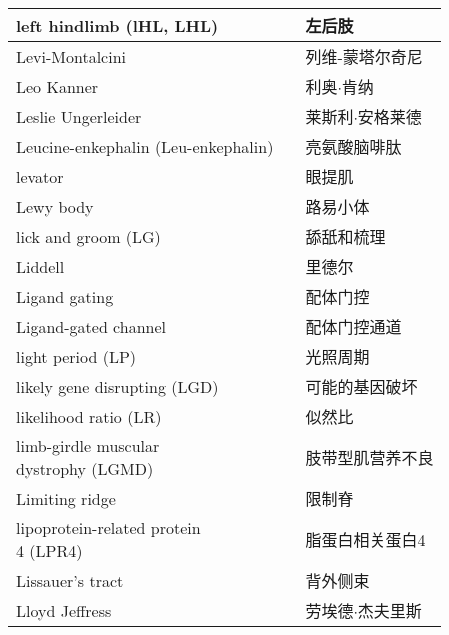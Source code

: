 \begin{longtable}{lll}
	\midrule
	left hindlimb (lHL, LHL)   && 左后肢  \\
	
	\midrule
	Levi-Montalcini   && 列维-蒙塔尔奇尼  \\
	
	\midrule
	Leo Kanner   && 利奥$\cdot$肯纳  \\
	
	\midrule
	Leslie Ungerleider   && 莱斯利$\cdot$安格莱德  \\
	
	\midrule
	Leucine-enkephalin (Leu-enkephalin)   && 亮氨酸脑啡肽  \\
	
	\midrule
	levator   && 眼提肌  \\
	
	\midrule
	Lewy body   && 路易小体  \\
	
	\midrule
	lick and groom (LG)  && 舔舐和梳理  \\
	
	\midrule
	Liddell  && 里德尔  \\
	
	\midrule
	Ligand gating  && 配体门控  \\
	
	\midrule
	Ligand-gated channel  && 配体门控通道  \\
	
	\midrule
	light period (LP)  && 光照周期  \\
	
	\midrule
	likely gene disrupting (LGD)  && 可能的基因破坏  \\
	
	\midrule
	likelihood ratio (LR) && 似然比  \\
	
	\midrule
	\makecell[l]{limb-girdle muscular \\dystrophy (LGMD)} && 肢带型肌营养不良  \\
	
	\midrule
	Limiting ridge && 限制脊  \\
	
	\midrule
	\makecell[l]{lipoprotein-related protein \\ 4 (LPR4)} && 脂蛋白相关蛋白4  \\
	
	\midrule
	Lissauer’s tract  && 背外侧束  \\
	
	\midrule
	Lloyd Jeffress  && 劳埃德$\cdot$杰夫里斯  \\
	

\end{longtable}
